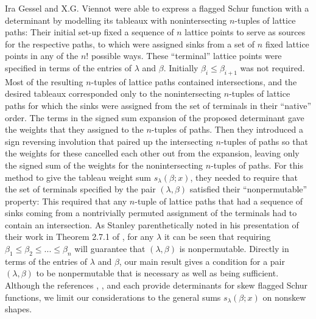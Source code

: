 \documentclass[11pt]{article}
\theoremstyle{definition}
\theoremstyle{remark}
\numberwithin{equation}{section}
\begin{document}
\begin{spacing}{1.35}
Ira Gessel and X.G. Viennot were able \cite{GV} to express a flagged Schur function with a determinant by modelling its tableaux with nonintersecting $n$-tuples of lattice paths:  Their initial set-up fixed a sequence of $n$ lattice points to serve as sources for the respective paths, to which were assigned sinks from a set of $n$ fixed lattice points in any of the $n!$ possible ways.  These ``terminal'' lattice points were specified in terms of the entries of $\lambda$ and $\beta$.  Initially $\beta_i \leq \beta_{i+1}$ was not required.  Most of the resulting $n$-tuples of lattice paths contained intersections, and the desired tableaux corresponded only to the nonintersecting $n$-tuples of lattice paths for which the sinks were assigned from the set of terminals in their ``native'' order.  The terms in the signed sum expansion of the proposed determinant gave the weights that they assigned to the $n$-tuples of paths.  Then they introduced a sign reversing involution that paired up the intersecting $n$-tuples of paths so that the weights for these cancelled each other out from the expansion, leaving only the signed sum of the weights for the nonintersecting $n$-tuples of paths.  For this method to give the tableau weight sum $s_\lambda(\beta;x)$, they needed to require that the set of terminals specified by the pair $(\lambda, \beta)$ satisfied their ``nonpermutable'' property:  This required that any $n$-tuple of lattice paths that had a sequence of sinks coming from a nontrivially permuted assignment of the terminals had to contain an intersection.  As Stanley parenthetically noted in his presentation of their work in Theorem 2.7.1 of \cite{St1}, for any $\lambda$ it can be seen that requiring $\beta_1 \leq \beta_2 \leq ... \leq \beta_n$ will guarantee that $(\lambda, \beta)$ is nonpermutable.  Directly in terms of the entries of $\lambda$ and $\beta$, our main result gives a condition for a pair $(\lambda, \beta)$ to be nonpermutable that is necessary as well as being sufficient.  Although the references \cite{GV}, \cite{St1}, and \cite{PS} each provide determinants for skew flagged Schur functions, we limit our considerations to the general sums $s_\lambda(\beta;x)$ on nonskew shapes.




\end{spacing}
\end{document}
